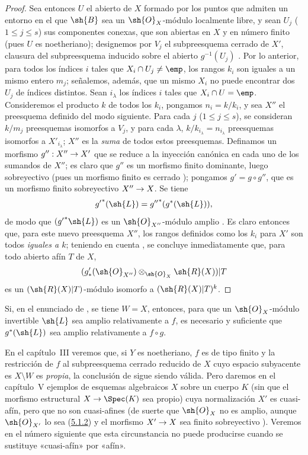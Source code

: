 \documentclass[oneside,10pt]{amsart}
\makeatletter
\renewcommand{\leq}{\leqslant}
\newcommand{\ega@arrow}[2]{\mathchoice{#1}{#2}{#2}{#2}}
\renewcommand{\to}{\ega@arrow{\longrightarrow}{\rightarrow}}
\let\EGAOriginalLabel\label
\renewcommand{\label}[1]{\phantomsection\EGAOriginalLabel{#1}}
\makeatother
\begin{document}
\begin{proof}
Sea entonces $U$ el abierto de $X$ formado por los puntos que admiten un entorno en el que $\sh{B}$ sea un $\sh{O}_X$-módulo localmente libre, y sean $U_j$ ($1\leq j\leq s$) sus componentes conexas, que son abiertas en $X$ y en número finito (pues $U$ es noetheriano);
designemos por $V_j$ el subpreesquema cerrado de $X'$, clausura del subpreesquema inducido sobre el abierto $g^{-1}(U_j)$ .
Por lo anterior, para todos los índices $i$ tales que $X_i\cap U_j\neq\emp$, los rangos $k_i$ son iguales a un mismo entero $m_j$;
señalemos, además, que un mismo $X_i$ no puede encontrar dos $U_j$ de índices distintos.
Sean $i_\lambda$ los índices $i$ tales que $X_i\cap U=\emp$.
Consideremos el producto $k$ de todos los $k_i$, pongamos $n_i=k/k_i$, y sea $X''$ el preesquema definido del modo siguiente.
Para cada $j$ ($1\leq j\leq s$), se consideran $k/m_j$ preesquemas isomorfos a $V_j$, y para cada $\lambda$, $k/k_{i_\lambda}=n_{i_\lambda}$ preesquemas isomorfos a $X'_{i_\lambda}$;
$X''$ es la \emph{suma} de todos estos preesquemas.
Definamos un morfismo $g'':X''\to X'$ que se reduce a la inyección canónica en cada uno de los sumandos de $X''$;
es claro que $g''$ es un morfismo finito dominante, luego sobreyectivo (pues un morfismo finito es cerrado );
pongamos $g'=g\circ g''$, que es un morfismo finito sobreyectivo $X''\to X$.
Se tiene
\[
  {g'}^*(\sh{L})={g''}^*(g^*(\sh{L})),
\]
de modo que $({g'}^*\sh{L})$ es un $\sh{O}_{X''}$-módulo amplio .
Es claro entonces que, para este nuevo preesquema $X''$, los rangos definidos como los $k_i$ para $X'$ son todos \emph{iguales a $k$};
teniendo en cuenta , se concluye inmediatamente que, para todo abierto afín $T$ de $X$,
\[
  (g'_*(\sh{O}_{X''})\otimes_{\sh{O}_X}\sh{R}(X))|T
\]
es un $(\sh{R}(X)|T)$-módulo isomorfo a $(\sh{R}(X)|T)^k$.
\end{proof}

\begin{corollary}[6.6.12]
\label{II.6.6.12}
Si, en el enunciado de , se tiene $W=X$, entonces, para que un $\sh{O}_X$-módulo invertible $\sh{L}$ sea amplio relativamente a $f$, es necesario y suficiente que $g^*(\sh{L})$ sea amplio relativamente a $f\circ g$.
\end{corollary}

\begin{remark}[6.6.13]
\label{II.6.6.13}
En el capítulo~III veremos que, si $Y$ es noetheriano, $f$ es de tipo finito y la restricción de $f$ al subpreesquema cerrado reducido de $X$ cuyo espacio subyacente es $X\setminus W$ es \emph{propia}, la conclusión de  sigue siendo válida.
Pero daremos en el capítulo~V ejemplos de esquemas algebraicos $X$ sobre un cuerpo $K$ (sin que el morfismo estructural $X\to\Spec(K)$ sea propio) cuya normalización $X'$ es cuasi-afín, pero que no son cuasi-afines (de suerte que $\sh{O}_X$ no es amplio, aunque $\sh{O}_{X'}$ lo sea \textup{(\hyperref[II.5.1.12]{5.1.2})} y el morfismo $X'\to X$ sea finito sobreyectivo ).
Veremos en el número siguiente que esta circunstancia no puede producirse cuando se sustituye «cuasi-afín» por «afín».
\end{remark}
\end{document}
